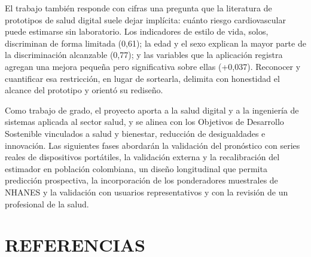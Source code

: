 \documentclass[12pt,letterpaper]{article}
\begin{document}
El trabajo también responde con cifras una pregunta que la literatura de
prototipos de salud digital suele dejar implícita: cuánto riesgo cardiovascular
puede estimarse sin laboratorio. Los indicadores de estilo de vida, solos,
discriminan de forma limitada (0,61); la edad y el sexo explican la mayor parte
de la discriminación alcanzable (0,77); y las variables que la aplicación
registra agregan una mejora pequeña pero significativa sobre ellas (+0,037).
Reconocer y cuantificar esa restricción, en lugar de sortearla, delimita con
honestidad el alcance del prototipo y orientó su rediseño.

Como trabajo de grado, el proyecto aporta a la salud digital y a la ingeniería de
sistemas aplicada al sector salud, y se alinea con los Objetivos de Desarrollo
Sostenible vinculados a salud y bienestar, reducción de desigualdades e
innovación. Las siguientes fases abordarán la validación del pronóstico con
series reales de dispositivos portátiles, la validación externa y la
recalibración del estimador en población colombiana, un diseño longitudinal que
permita predicción prospectiva, la incorporación de los ponderadores muestrales
de NHANES y la validación con usuarios representativos y con la revisión de un
profesional de la salud.

\newpage

\section*{REFERENCIAS}
\end{document}
